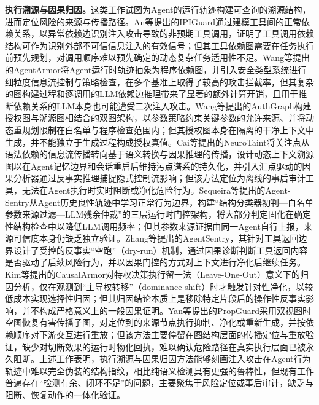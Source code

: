 \textbf{执行溯源与因果归因。}这类工作试图为Agent的运行轨迹构建可查询的溯源结构，进而定位风险的来源与传播路径。An等\cite{an2025ipiguard}提出的IPIGuard通过建模工具间的正常依赖关系，以异常依赖边识别注入攻击导致的非预期工具调用，证明了工具调用依赖结构可作为识别外部不可信信息注入的有效信号；但其工具依赖图需要在任务执行前预先规划，对调用顺序难以预先确定的动态复杂任务适用性不足。Wang等\cite{wang2025agentarmor}提出的AgentArmor将Agent运行时轨迹抽象为程序依赖图，并引入安全类型系统进行细粒度信息流控制与策略检查，在多个基准上取得了较高的攻击拦截率，但其复杂的图构建过程和逐调用的LLM依赖边推理带来了显著的额外计算开销，且用于推断依赖关系的LLM本身也可能遭受二次注入攻击。Wang等\cite{wang2026authgraph}提出的AuthGraph构建授权图与溯源图相结合的双图架构，以参数策略约束关键参数的允许来源、并将动态重规划限制在白名单与程序检查范围内；但其授权图本身在隔离的干净上下文中生成，并不能独立于生成过程构成授权真值。Cai等\cite{cai2026ghost}提出的NeuroTaint将关注点从语法依赖的信息流传播转向基于语义转换与因果推理的传播，设计动态上下文溯源图以在Agent记忆边界和会话重启后维持污点谱系的持久化，并引入汇点驱动的因果分析器通过反事实推理捕捉隐式控制流影响；但该方法定位为离线的事后审计工具，无法在Agent执行时实时阻断或净化危险行为。Sequeira等\cite{sequeira2026agentsentry}提出的Agent-Sentry从Agent历史良性轨迹中学习正常行为边界，构建“结构分类器初判—白名单参数来源过滤—LLM残余仲裁”的三层运行时门控架构，将大部分判定固化在确定性结构检查中以降低LLM调用频率；但其参数来源证据由同一Agent自行上报，来源可信度本身仍缺乏独立验证。Zhang等\cite{zhang2026agentsentry}提出的AgentSentry，其针对工具返回边界设计了受控的反事实“空跑”（dry-run）机制，通过因果诊断判断工具返回内容是否驱动了后续风险行为，并以因果门控的方式对上下文进行净化后继续任务。Kim等\cite{kim2026causalarmor}提出的CausalArmor对特权决策执行留一法（Leave-One-Out）意义下的归因分析，仅在观测到“主导权转移”（dominance shift）时才触发针对性净化，以较低成本实现选择性归因；但其归因结论本质上是移除特定片段后的操作性反事实影响，并不构成严格意义上的一般因果证明。Yan等\cite{yan2026propguard}提出的PropGuard采用双视图时空图恢复有害传播子图，对定位到的来源节点执行抑制、净化或重新生成，并按依赖顺序对下游交互进行重放；但该方法主要停留在图结构层面的传播定位与重放验证，缺少对切断效果的运行时物化回执，难以确认危险路径在真实执行层面已被永久阻断。上述工作表明，执行溯源与因果归因方法能够刻画注入攻击在Agent行为轨迹中难以完全伪装的结构指纹，相比纯语义检测具有更强的鲁棒性，但现有工作普遍存在“检测有余、闭环不足”的问题，主要聚焦于风险定位或事后审计，缺乏与阻断、恢复动作的一体化验证。

